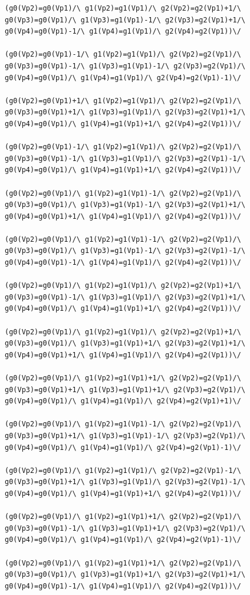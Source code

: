 \begin{appendices}
\begin{lstlisting}
(g0(Vp2)=g0(Vp1)/\ g1(Vp2)=g1(Vp1)/\ g2(Vp2)=g2(Vp1)+1/\ g0(Vp3)=g0(Vp1)/\ g1(Vp3)=g1(Vp1)-1/\ g2(Vp3)=g2(Vp1)+1/\ g0(Vp4)=g0(Vp1)-1/\ g1(Vp4)=g1(Vp1)/\ g2(Vp4)=g2(Vp1))\/ 

(g0(Vp2)=g0(Vp1)-1/\ g1(Vp2)=g1(Vp1)/\ g2(Vp2)=g2(Vp1)/\ g0(Vp3)=g0(Vp1)-1/\ g1(Vp3)=g1(Vp1)-1/\ g2(Vp3)=g2(Vp1)/\ g0(Vp4)=g0(Vp1)/\ g1(Vp4)=g1(Vp1)/\ g2(Vp4)=g2(Vp1)-1)\/ 

(g0(Vp2)=g0(Vp1)+1/\ g1(Vp2)=g1(Vp1)/\ g2(Vp2)=g2(Vp1)/\ g0(Vp3)=g0(Vp1)+1/\ g1(Vp3)=g1(Vp1)/\ g2(Vp3)=g2(Vp1)+1/\ g0(Vp4)=g0(Vp1)/\ g1(Vp4)=g1(Vp1)+1/\ g2(Vp4)=g2(Vp1))\/ 

(g0(Vp2)=g0(Vp1)-1/\ g1(Vp2)=g1(Vp1)/\ g2(Vp2)=g2(Vp1)/\ g0(Vp3)=g0(Vp1)-1/\ g1(Vp3)=g1(Vp1)/\ g2(Vp3)=g2(Vp1)-1/\ g0(Vp4)=g0(Vp1)/\ g1(Vp4)=g1(Vp1)+1/\ g2(Vp4)=g2(Vp1))\/ 

(g0(Vp2)=g0(Vp1)/\ g1(Vp2)=g1(Vp1)-1/\ g2(Vp2)=g2(Vp1)/\ g0(Vp3)=g0(Vp1)/\ g1(Vp3)=g1(Vp1)-1/\ g2(Vp3)=g2(Vp1)+1/\ g0(Vp4)=g0(Vp1)+1/\ g1(Vp4)=g1(Vp1)/\ g2(Vp4)=g2(Vp1))\/ 

(g0(Vp2)=g0(Vp1)/\ g1(Vp2)=g1(Vp1)-1/\ g2(Vp2)=g2(Vp1)/\ g0(Vp3)=g0(Vp1)/\ g1(Vp3)=g1(Vp1)-1/\ g2(Vp3)=g2(Vp1)-1/\ g0(Vp4)=g0(Vp1)-1/\ g1(Vp4)=g1(Vp1)/\ g2(Vp4)=g2(Vp1))\/ 

(g0(Vp2)=g0(Vp1)/\ g1(Vp2)=g1(Vp1)/\ g2(Vp2)=g2(Vp1)+1/\ g0(Vp3)=g0(Vp1)-1/\ g1(Vp3)=g1(Vp1)/\ g2(Vp3)=g2(Vp1)+1/\ g0(Vp4)=g0(Vp1)/\ g1(Vp4)=g1(Vp1)+1/\ g2(Vp4)=g2(Vp1))\/ 

(g0(Vp2)=g0(Vp1)/\ g1(Vp2)=g1(Vp1)/\ g2(Vp2)=g2(Vp1)+1/\ g0(Vp3)=g0(Vp1)/\ g1(Vp3)=g1(Vp1)+1/\ g2(Vp3)=g2(Vp1)+1/\ g0(Vp4)=g0(Vp1)+1/\ g1(Vp4)=g1(Vp1)/\ g2(Vp4)=g2(Vp1))\/ 

(g0(Vp2)=g0(Vp1)/\ g1(Vp2)=g1(Vp1)+1/\ g2(Vp2)=g2(Vp1)/\ g0(Vp3)=g0(Vp1)+1/\ g1(Vp3)=g1(Vp1)+1/\ g2(Vp3)=g2(Vp1)/\ g0(Vp4)=g0(Vp1)/\ g1(Vp4)=g1(Vp1)/\ g2(Vp4)=g2(Vp1)+1)\/ 

(g0(Vp2)=g0(Vp1)/\ g1(Vp2)=g1(Vp1)-1/\ g2(Vp2)=g2(Vp1)/\ g0(Vp3)=g0(Vp1)+1/\ g1(Vp3)=g1(Vp1)-1/\ g2(Vp3)=g2(Vp1)/\ g0(Vp4)=g0(Vp1)/\ g1(Vp4)=g1(Vp1)/\ g2(Vp4)=g2(Vp1)-1)\/ 

(g0(Vp2)=g0(Vp1)/\ g1(Vp2)=g1(Vp1)/\ g2(Vp2)=g2(Vp1)-1/\ g0(Vp3)=g0(Vp1)+1/\ g1(Vp3)=g1(Vp1)/\ g2(Vp3)=g2(Vp1)-1/\ g0(Vp4)=g0(Vp1)/\ g1(Vp4)=g1(Vp1)+1/\ g2(Vp4)=g2(Vp1))\/ 

(g0(Vp2)=g0(Vp1)/\ g1(Vp2)=g1(Vp1)+1/\ g2(Vp2)=g2(Vp1)/\ g0(Vp3)=g0(Vp1)-1/\ g1(Vp3)=g1(Vp1)+1/\ g2(Vp3)=g2(Vp1)/\ g0(Vp4)=g0(Vp1)/\ g1(Vp4)=g1(Vp1)/\ g2(Vp4)=g2(Vp1)-1)\/ 

(g0(Vp2)=g0(Vp1)/\ g1(Vp2)=g1(Vp1)+1/\ g2(Vp2)=g2(Vp1)/\ g0(Vp3)=g0(Vp1)/\ g1(Vp3)=g1(Vp1)+1/\ g2(Vp3)=g2(Vp1)+1/\ g0(Vp4)=g0(Vp1)-1/\ g1(Vp4)=g1(Vp1)/\ g2(Vp4)=g2(Vp1))\/ 


\end{lstlisting}
\end{appendices}

